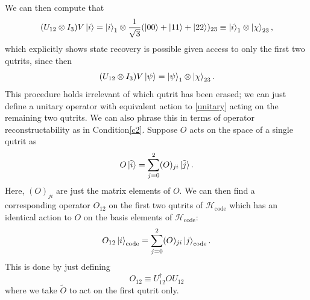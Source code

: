 \documentclass[12pt,a4paper]{report}
\numberwithin{equation}{section}
\newcommand{\Hcode}{\mathcal{H}_{\text{code}}}
\theoremstyle{definition}
\theoremstyle{theorem}
\theoremstyle{theorem}
\theoremstyle{example}
\theoremstyle{definition}
\begin{document}
We can then compute that
\begin{equation}
	(U_{12}\otimes I_{3})V\ket{{i}}=\ket{i}_{1}\otimes\frac{1}{\sqrt{3}}(\ket{{00}}+\ket{{11}}+\ket{{22}})_{23}\equiv\ket{{i}}_{1}\otimes\ket{\chi}_{23},
\end{equation}
which explicitly shows state recovery is possible given access to only the first two qutrits, since then
\begin{equation}\label{staterec}
	(U_{12}\otimes I_{3})V\ket{{\psi}}=\ket{{\psi}}_{1}\otimes\ket{\chi}_{23}.
\end{equation}
This procedure holds irrelevant of which qutrit has been erased; we can just define a unitary operator with equivalent action to \ref{unitary} acting on the remaining two qutrits. We can also phrase this in terms of operator reconstructability as in Condition\ref{c2}. Suppose ${O}$ acts on the space of a single qutrit as
\begin{equation}
	{O}\ket{\tilde{i}}=\sum_{j=0}^{2}(O)_{ji}\ket{\tilde{j}}.
\end{equation}
Here, $(O)_{ji}$ are just the matrix elements of $O$. We can then find a corresponding operator $O_{12}$ on the first two qutrits of $\Hcode$ which has an identical action to $O$ on the basis elements of $\Hcode$:
\begin{equation}
	O_{12}\ket{i}_{\text{code}}=\sum_{j=0}^{2}(O)_{ji}\ket{j}_{\text{code}}.
\end{equation}
This is done by just defining
\begin{equation}
	O_{12}\equiv U_{12}^{\dagger}OU_{12}
\end{equation}
where we take $\tilde{O}$ to act on the first qutrit only.
\end{document}
